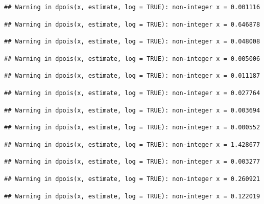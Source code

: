 \documentclass[]{article}
\begin{document}
\begin{verbatim}
## Warning in dpois(x, estimate, log = TRUE): non-integer x = 0.001116
\end{verbatim}

\begin{verbatim}
## Warning in dpois(x, estimate, log = TRUE): non-integer x = 0.646878
\end{verbatim}

\begin{verbatim}
## Warning in dpois(x, estimate, log = TRUE): non-integer x = 0.048008
\end{verbatim}

\begin{verbatim}
## Warning in dpois(x, estimate, log = TRUE): non-integer x = 0.005006
\end{verbatim}

\begin{verbatim}
## Warning in dpois(x, estimate, log = TRUE): non-integer x = 0.011187
\end{verbatim}

\begin{verbatim}
## Warning in dpois(x, estimate, log = TRUE): non-integer x = 0.027764
\end{verbatim}

\begin{verbatim}
## Warning in dpois(x, estimate, log = TRUE): non-integer x = 0.003694
\end{verbatim}

\begin{verbatim}
## Warning in dpois(x, estimate, log = TRUE): non-integer x = 0.000552
\end{verbatim}

\begin{verbatim}
## Warning in dpois(x, estimate, log = TRUE): non-integer x = 1.428677
\end{verbatim}

\begin{verbatim}
## Warning in dpois(x, estimate, log = TRUE): non-integer x = 0.003277
\end{verbatim}

\begin{verbatim}
## Warning in dpois(x, estimate, log = TRUE): non-integer x = 0.260921
\end{verbatim}

\begin{verbatim}
## Warning in dpois(x, estimate, log = TRUE): non-integer x = 0.122019
\end{verbatim}
\end{document}
